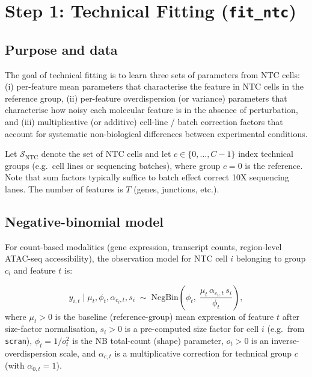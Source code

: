 \documentclass[12pt]{article}
\newcommand{\NB}{\mathrm{NegBin}}
\newcommand{\given}{\mid}
\begin{document}
\section{Step 1: Technical Fitting (\texttt{fit\_ntc})}

\subsection{Purpose and data}

The goal of technical fitting is to learn three sets of parameters from NTC cells:
(i) per-feature mean parameters that characterise the feature in NTC cells in the reference group,
(ii) per-feature overdispersion (or variance) parameters that characterise how noisy
each molecular feature is in the absence of perturbation, and (iii) multiplicative
(or additive) cell-line / batch correction factors that account for systematic
non-biological differences between experimental conditions.

Let $\mathcal{S}_{\mathrm{NTC}}$ denote the set of NTC cells and let $c \in \{0, \ldots, C-1\}$
index technical groups (e.g.\ cell lines or sequencing batches), where group $c=0$ is the
reference. Note that sum factors typically suffice to batch effect correct 10X sequencing lanes.
The number of features is $T$ (genes, junctions, etc.).

\subsection{Negative-binomial model}

For count-based modalities (gene expression, transcript counts, region-level ATAC-seq accessibility), the observation model for
NTC cell $i$ belonging to group $c_i$ and feature $t$ is:

\begin{equation}
  y_{i,t} \given \mu_t, \phi_t, \alpha_{c_i,t}, s_i
    \;\sim\; \NB\!\left(\phi_t,\;
      \frac{\mu_t \,\alpha_{c_i,t}\, s_i}{\phi_t}\right),
  \label{eq:ntc_negbinom_obs}
\end{equation}
%
where $\mu_t > 0$ is the baseline (reference-group) mean expression of feature $t$ after
size-factor normalisation, $s_i > 0$ is a pre-computed size factor for cell $i$
(e.g.\ from \texttt{scran}), $\phi_t = 1/o_t^2$ is the NB total-count (shape) parameter,
$o_t > 0$ is an inverse-overdispersion scale, and $\alpha_{c,t}$ is a multiplicative
correction for technical group $c$ (with $\alpha_{0,t} = 1$).
\end{document}
